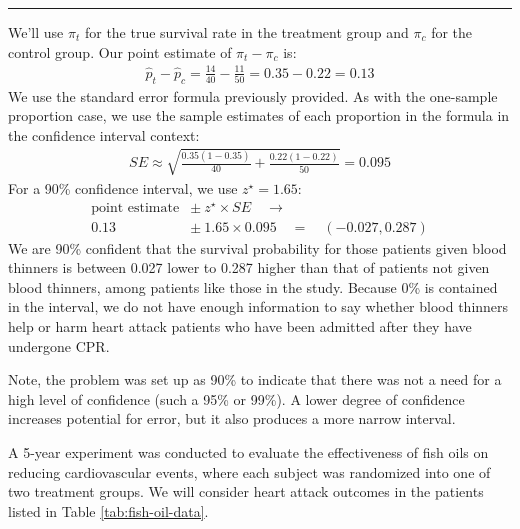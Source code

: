 \documentclass[
  10pt,
  openany]{book}
\theoremstyle{definition}
\theoremstyle{definition}
\theoremstyle{definition}
\theoremstyle{definition}
\theoremstyle{remark}
\begin{document}
\begin{center}\rule{0.5\linewidth}{0.5pt}\end{center}

We'll use \(\pi_t\) for the true survival rate in the treatment group and \(\pi_c\) for the control group. Our point estimate of \(\pi_t - \pi_c\) is: \begin{align*}
  \hat{p}_{t} - \hat{p}_{c}
    = \frac{14}{40} - \frac{11}{50}
    = 0.35 - 0.22
    = 0.13
  \end{align*} We use the standard error formula previously provided. As with the one-sample proportion case, we use the sample estimates of each proportion in the formula in the confidence interval context: \begin{align*}
  SE \approx \sqrt{\frac{0.35 (1 - 0.35)}{40} +
      \frac{0.22 (1 - 0.22)}{50}}
    = 0.095
  \end{align*} For a 90\% confidence interval, we use \(z^{\star} = 1.65\): \begin{align*}
  \text{point estimate} &\pm\ z^{\star} \times SE \quad \to\\
   0.13 \ &\pm\ 1.65 \times  0.095 \quad = \quad (-0.027, 0.287)
  \end{align*} We are 90\% confident that the survival probability for those patients given blood thinners is between 0.027 lower to 0.287 higher than that of patients not given blood thinners, among patients like those in the study. Because 0\% is contained in the interval, we do not have enough information to say whether blood thinners help or harm heart attack patients who have been admitted after they have undergone CPR.

Note, the problem was set up as 90\% to indicate that there was not a need for a high level of confidence (such a 95\% or 99\%). A lower degree of confidence increases potential for error, but it also produces a more narrow interval.


A 5-year experiment was conducted to evaluate the effectiveness of fish oils on reducing cardiovascular events, where each subject was randomized into one of two treatment groups. We will consider heart attack outcomes in the patients listed in Table \ref{tab:fish-oil-data}.
\end{document}
